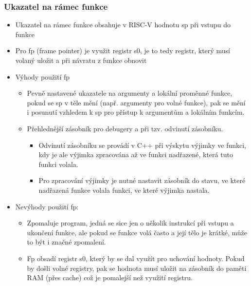 \documentclass{beamer}
\begin{document}
\begin{frame}[shrink=5]
\frametitle{Ukazatel na rámec funkce}

\begin{itemize}
 \item Ukazatel na rámec funkce obsahuje v RISC-V hodnotu sp při vstupu do funkce
 \item Pro fp (frame pointer) je využit registr s0, je to tedy registr, který musí volaný uložit a při návratu z funkce obnovit
 \item Výhody použití fp
\begin{itemize}
 \item Pevně nastavené ukazatele na argumenty a lokální proměnné funkce, pokud se sp v těle mění (např. argumenty pro volné funkce), pak se mění i posunutí vzhledem k sp pro přístup k argumentům a lokálním funkcím.
 \item Přehlednější zásobník pro debugery a při tzv. odvinutí zásobníku.
\begin{itemize}
 \item Odvinutí zásobníku se provádí v C++ při výskytu výjimky ve funkci, kdy je ale výjimka zpracována až ve funkci nadřazené, která tuto funkci volala.
 \item Pro zpracování výjimky je nutné nastavit zásobník do stavu, ve které nadřazená funkce volala funkci, ve které výjimka nastala.
\end{itemize}
\end{itemize}
 \item Nevýhody použití fp:
\begin{itemize}
 \item Zpomaluje program, jedná se sice jen o několik instrukcí při vstupu a ukončení funkce, ale pokud se funkce volá často a její tělo je krátké, může to být i značné zpomalení.
 \item Fp obsadí registr s0, který by se dal využít pro uchování hodnoty. Pokud by došli volné registry, pak se hodnota musí uložit na zásobník do paměti RAM (přes cache) což je pomalejší než využití registru.
\end{itemize}
\end{itemize}
\end{frame}
\end{document}
